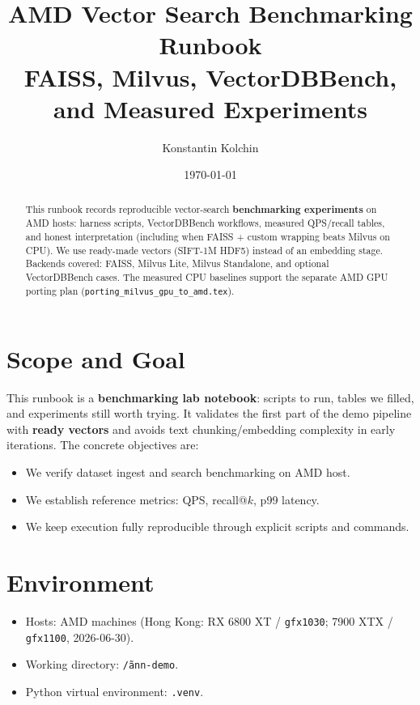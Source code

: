 \documentclass[11pt,a4paper]{article}
\title{AMD Vector Search Benchmarking Runbook\\[0.3em]
\large FAISS, Milvus, VectorDBBench, and Measured Experiments}
\author{Konstantin Kolchin}
\date{\today}
\begin{document}
\maketitle

\begin{abstract}
This runbook records reproducible vector-search \textbf{benchmarking experiments} on AMD
hosts: harness scripts, VectorDBBench workflows, measured QPS/recall tables, and honest
interpretation (including when FAISS + custom wrapping beats Milvus on CPU).
We use ready-made vectors (SIFT-1M HDF5) instead of an embedding stage.
Backends covered: FAISS, Milvus Lite, Milvus Standalone, and optional VectorDBBench cases.
The measured CPU baselines support the separate AMD GPU porting plan
(\texttt{porting\_milvus\_gpu\_to\_amd.tex}).
\end{abstract}

\tableofcontents
\clearpage

\section{Scope and Goal}

This runbook is a \textbf{benchmarking lab notebook}: scripts to run, tables we filled, and
experiments still worth trying. It validates the first part of the demo pipeline with
\textbf{ready vectors} and avoids text chunking/embedding complexity in early iterations.
The concrete objectives are:
\begin{itemize}[leftmargin=*]
  \item We verify dataset ingest and search benchmarking on AMD host.
  \item We establish reference metrics: QPS, recall@$k$, p99 latency.
  \item We keep execution fully reproducible through explicit scripts and commands.
\end{itemize}

\section{Environment}

\begin{itemize}[leftmargin=*]
  \item Hosts: AMD machines (Hong Kong: RX 6800 XT / \texttt{gfx1030};
        7900 XTX / \texttt{gfx1100}, 2026-06-30).
  \item Working directory: \texttt{\~/ann-demo}.
  \item Python virtual environment: \texttt{.venv}.
\end{itemize}
\end{document}

